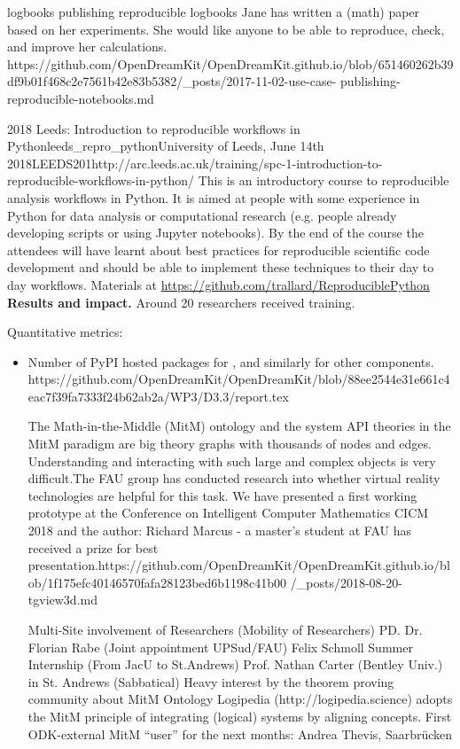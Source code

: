 \begin{Aim 1}
\begin{Aim 2}
      logbooks 
      publishing reproducible logbooks
      Jane has written a (math) paper based on her experiments. She would like anyone to be able to reproduce, check, and improve her 
      calculations.
      https://github.com/OpenDreamKit/OpenDreamKit.github.io/blob/651460262b39df9b01f468c2e7561b42e83b5382/_posts/2017-11-02-use-case-
      publishing-reproducible-notebooks.md
     
     \begin{event}{2018 Leeds: Introduction to reproducible workflows in Python}{leeds_repro_python}{University of Leeds, June 14th 
     2018}{LEEDS}{20}{1}{http://arc.leeds.ac.uk/training/spc-1-introduction-to-reproducible-workflows-in-python/}
     This is an introductory course to reproducible analysis workflows in Python. It is aimed at people with some experience in Python for 
     data analysis or computational research (e.g. people already developing scripts or using Jupyter notebooks). By the end of the course 
     the attendees will have learnt about best practices for reproducible scientific code development and should be able to implement these 
     techniques to their day to day workflows.
     Materials at \url{https://github.com/trallard/ReproduciblePython}
     \textbf{Results and impact.} Around 20 researchers received training.
     
    

    Quantitative metrics:
    \begin{itemize}
    \item Number of PyPI hosted packages for \Sage, and similarly for other components.
     https://github.com/OpenDreamKit/OpenDreamKit/blob/88ee2544e31e661c4eac7f39fa7333f24b62ab2a/WP3/D3.3/report.tex
  
       The Math-in-the-Middle (MitM) ontology and the system API theories in the MitM paradigm are big theory graphs with thousands of 
       nodes and edges. Understanding and interacting with such large and complex objects is very difficult.The FAU group has conducted
       research into whether virtual reality technologies are helpful for this task. We have presented a first working prototype at the
       Conference on Intelligent Computer Mathematics CICM 2018 and the author: Richard Marcus - a master's student at FAU has received a
       prize for best presentation.https://github.com/OpenDreamKit/OpenDreamKit.github.io/blob/1f175efc40146570fafa28123bed6b1198c41b00
       /_posts/2018-08-20-tgview3d.md
       
       
Multi-Site involvement of Researchers (Mobility of Researchers)
PD. Dr. Florian Rabe (Joint appointment UPSud/FAU)
Felix Schmoll Summer Internship (From JacU to St.Andrews)
Prof. Nathan Carter (Bentley Univ.) in St. Andrews (Sabbatical)
Heavy interest by the theorem proving community about MitM Ontology
Logipedia (http://logipedia.science) adopts the MitM principle of integrating (logical) systems by aligning concepts.
First ODK-external MitM “user” for the next months: Andrea Thevis, Saarbrücken 
    

\end{itemize}
\end{event}
\end{Aim 2}
\end{Aim 1}
